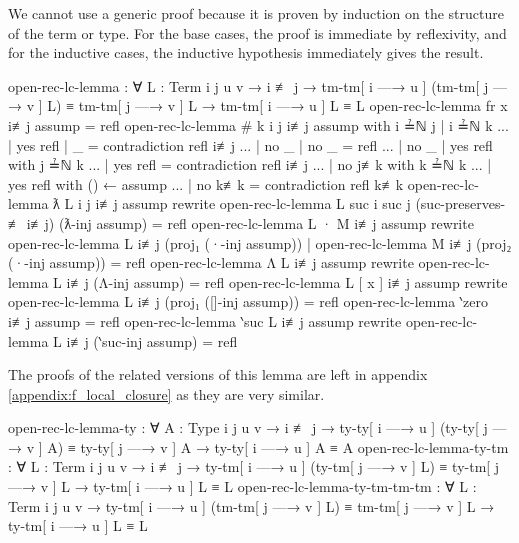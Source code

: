 \documentclass[logo,bsc,singlespacing,parskip,online]{infthesis}
\begin{document}
We cannot use a generic proof because it is proven by induction on the structure of the term or
type. For the base cases, the proof is immediate by reflexivity, and for the inductive cases, the
inductive hypothesis immediately gives the result.
\begin{code}
  open-rec-lc-lemma : ∀ {L : Term} {i j u v} → i ≢ j
    → tm-tm[ i —→ u ] (tm-tm[ j —→ v ] L) ≡ tm-tm[ j —→ v ] L
    → tm-tm[ i —→ u ] L ≡ L
  open-rec-lc-lemma {fr x} i≢j assump = refl
  open-rec-lc-lemma {# k} {i} {j} i≢j assump
    with i ≟ℕ j | i ≟ℕ k
  ... | yes refl | _ = contradiction refl i≢j
  ... | no _     | no _ = refl
  ... | no _     | yes refl with j ≟ℕ k
  ...   | yes refl = contradiction refl i≢j
  ...   | no j≢k with k ≟ℕ k
  ...     | yes refl with () ← assump
  ...     | no  k≢k  = contradiction refl k≢k
  open-rec-lc-lemma {ƛ L} {i} {j} i≢j assump
    rewrite open-rec-lc-lemma {L} {suc i} {suc j}
      (suc-preserves-≢ i≢j)
      (ƛ-inj assump) = refl
  open-rec-lc-lemma {L · M} i≢j assump rewrite
      open-rec-lc-lemma {L} i≢j (proj₁ (·-inj assump))
    | open-rec-lc-lemma {M} i≢j (proj₂ (·-inj assump)) = refl
  open-rec-lc-lemma {Λ L} i≢j assump
    rewrite open-rec-lc-lemma {L} i≢j (Λ-inj assump) = refl
  open-rec-lc-lemma {L [ x ]} i≢j assump
    rewrite open-rec-lc-lemma {L} i≢j (proj₁ ([]-inj assump)) = refl
  open-rec-lc-lemma {‵zero} i≢j assump = refl
  open-rec-lc-lemma {‵suc L} i≢j assump
    rewrite open-rec-lc-lemma {L} i≢j (‵suc-inj assump) = refl
\end{code}

The proofs of the related versions of this lemma are left in appendix \ref{appendix:f_local_closure} as they are very similar.
\begin{code}
  open-rec-lc-lemma-ty : ∀ {A : Type} {i j u v} → i ≢ j
    → ty-ty[ i —→ u ] (ty-ty[ j —→ v ] A) ≡ ty-ty[ j —→ v ] A
    → ty-ty[ i —→ u ] A ≡ A
  open-rec-lc-lemma-ty-tm : ∀ {L : Term} {i j u v} → i ≢ j
    → ty-tm[ i —→ u ] (ty-tm[ j —→ v ] L) ≡ ty-tm[ j —→ v ] L
    → ty-tm[ i —→ u ] L ≡ L
  open-rec-lc-lemma-ty-tm-tm-tm : ∀ {L : Term} {i j u v}
    → ty-tm[ i —→ u ] (tm-tm[ j —→ v ] L) ≡ tm-tm[ j —→ v ] L
    → ty-tm[ i —→ u ] L ≡ L
\end{code}
\end{document}
